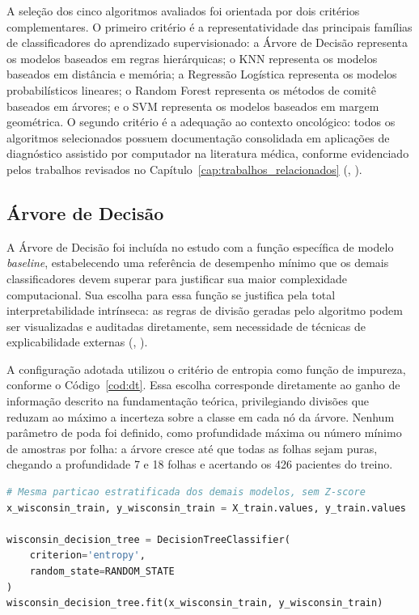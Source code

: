 \documentclass[
    12pt
    ,oneside
    ,a4paper
    ,chapter=TITLE
    ,section=TITLE
    ,sumario=abnt-6027-2012
    ,english,brazil]{abntex2} %
\begin{document}
A seleção dos cinco algoritmos avaliados foi orientada por dois critérios
complementares. O primeiro critério é a representatividade das principais
famílias de classificadores do aprendizado supervisionado: a Árvore de Decisão
representa os modelos baseados em regras hierárquicas; o KNN representa os
modelos baseados em distância e memória; a Regressão Logística representa os
modelos probabilísticos lineares; o Random Forest representa os métodos de
comitê baseados em árvores; e o SVM representa os modelos baseados em margem
geométrica. O segundo critério é a adequação ao contexto oncológico: todos os
algoritmos selecionados possuem documentação consolidada em aplicações de
diagnóstico assistido por computador na literatura médica, conforme evidenciado
pelos trabalhos revisados no Capítulo~\ref{cap:trabalhos_relacionados}
(, \citeyear{Cruz2006}).

\subsection{Árvore de Decisão}
\label{subsec:arvore-decisao}

A Árvore de Decisão foi incluída no estudo com a função específica de modelo
\textit{baseline}, estabelecendo uma referência de desempenho mínimo que os
demais classificadores devem superar para justificar sua maior complexidade
computacional. Sua escolha para essa função se justifica pela total
interpretabilidade intrínseca: as regras de divisão geradas pelo algoritmo
podem ser visualizadas e auditadas diretamente, sem necessidade de técnicas
de explicabilidade externas (,
\citeyear{Faceli2011}).

A configuração adotada utilizou o critério de entropia como função de impureza,
conforme o Código~\ref{cod:dt}. Essa escolha corresponde diretamente ao ganho
de informação descrito na fundamentação teórica, privilegiando divisões que
reduzam ao máximo a incerteza sobre a classe em cada nó da árvore. Nenhum
parâmetro de poda foi definido, como profundidade máxima ou número mínimo de
amostras por folha: a árvore cresce até que todas as folhas sejam puras,
chegando a profundidade 7 e 18 folhas e acertando os 426 pacientes do treino.

\begin{codigo}[htb]
\begin{lstlisting}[language=Python]
# Mesma particao estratificada dos demais modelos, sem Z-score
x_wisconsin_train, y_wisconsin_train = X_train.values, y_train.values

wisconsin_decision_tree = DecisionTreeClassifier(
    criterion='entropy',
    random_state=RANDOM_STATE
)
wisconsin_decision_tree.fit(x_wisconsin_train, y_wisconsin_train)
\end{lstlisting}
\fonteautor
\end{codigo}
\end{document}
